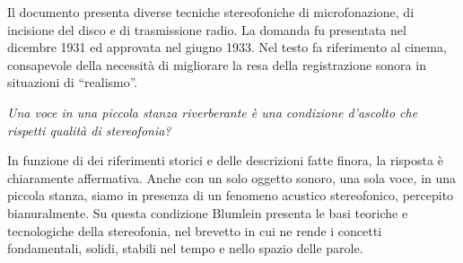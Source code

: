 Il documento presenta diverse tecniche stereofoniche di microfonazione, di
incisione del disco e di trasmissione radio. La domanda fu presentata nel
dicembre 1931 ed approvata nel giugno 1933. Nel testo fa riferimento al cinema,
consapevole della necessità di migliorare la resa della registrazione sonora
in situazioni di “realismo”.

\emph{Una voce in una piccola stanza riverberante è una condizione d'ascolto che
rispetti qualità di stereofonia?}

In funzione di dei riferimenti storici e delle descrizioni fatte finora, la
risposta è chiaramente affermativa. Anche con un solo oggetto sonoro, una sola
voce, in una piccola stanza, siamo in presenza di un fenomeno acustico
stereofonico, percepito bianuralmente. Su questa condizione Blumlein presenta
le basi teoriche e tecnologiche della stereofonia, nel brevetto in cui ne
rende i concetti fondamentali, solidi, stabili nel tempo e nello spazio delle
parole.

